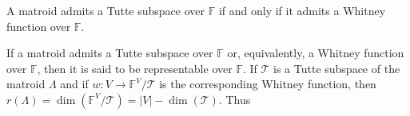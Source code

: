 A matroid admits a Tutte subspace over $\mathbb{F}$ if and only if it admits a Whitney function over $\mathbb{F}$.

If a matroid admits a Tutte subspace over $\mathbb{F}$ or, equivalently, a Whitney function over $\mathbb{F}$, then it is said to be representable over $\mathbb{F}$. If $\mathcal{T}$ is a Tutte subspace of the matroid $\Lambda$ and if $w: V \rightarrow \mathbb{F}^V / \mathcal{T}$ is the corresponding Whitney function, then $r(\Lambda) = \dim(\mathbb{F}^V / \mathcal{T}) = |V| - \dim(\mathcal{T})$. Thus
